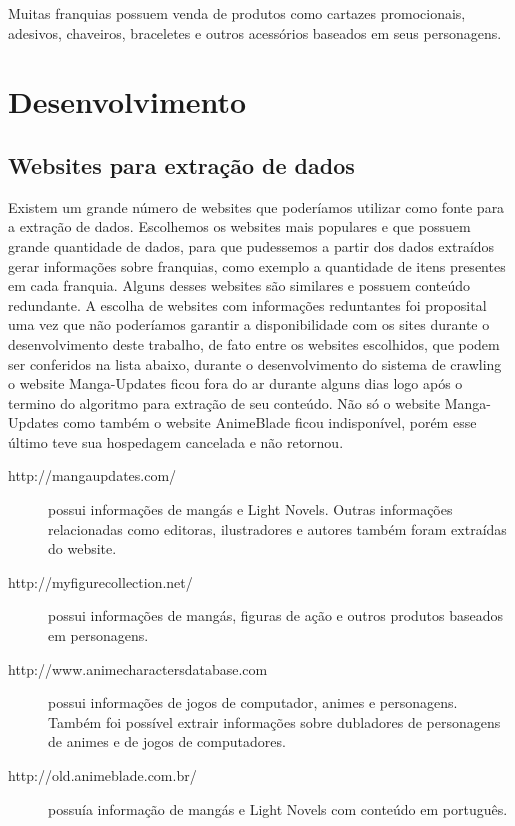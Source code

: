 \documentclass[12pt]{article}
\begin{document}
Muitas franquias possuem venda de produtos como cartazes promocionais, adesivos, chaveiros, braceletes e outros acessórios baseados em seus personagens.


\section{Desenvolvimento}

\subsection{Websites para extração de dados}

Existem um grande número de websites que poderíamos utilizar como fonte para a extração de dados. Escolhemos os websites mais populares e que possuem grande quantidade de dados, para que pudessemos a partir dos dados extraídos gerar informações sobre franquias, como exemplo a quantidade de itens presentes em cada franquia. 
Alguns desses websites são similares e possuem conteúdo redundante. A escolha de websites com informações reduntantes foi proposital uma vez que não poderíamos garantir a disponibilidade com os sites durante o desenvolvimento deste trabalho, de fato entre os websites escolhidos, que podem ser conferidos na lista abaixo, durante o desenvolvimento do sistema de crawling o website Manga-Updates ficou fora do ar durante alguns dias logo após o termino do algoritmo para extração de seu conteúdo. Não só o website Manga-Updates como também o website AnimeBlade ficou indisponível, porém esse último teve sua hospedagem cancelada e não retornou.

\begin{description}
\item[http://mangaupdates.com/] possui informações de mangás e Light Novels. Outras informações relacionadas como editoras, ilustradores e autores também foram extraídas do website.
\item[http://myfigurecollection.net/] possui informações de mangás, figuras de ação e outros produtos baseados em personagens.
\item[http://www.animecharactersdatabase.com] possui informações de jogos de computador, animes e personagens. Também foi possível extrair informações sobre dubladores de personagens de animes e de jogos de computadores. 
\item[http://old.animeblade.com.br/] possuía informação de mangás e Light Novels com conteúdo em português.
\end{description}
\end{document}
